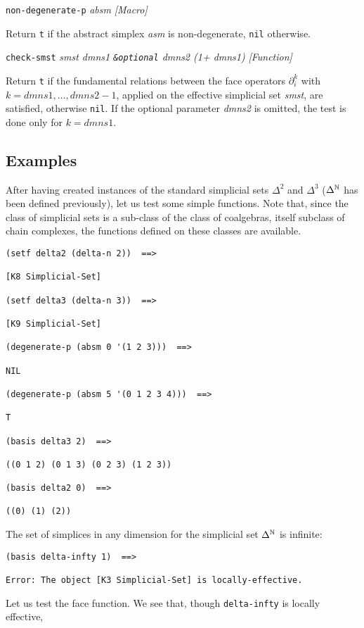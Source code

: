 {{\leftskip=5mm
{\tt non-degenerate-p} {\em  absm} \hfill {\em [Macro]} \par}
{\leftskip=15mm
Return {\tt t} if the abstract simplex {\em asm} is non-degenerate, {\tt nil} otherwise. \par}
{\leftskip=5mm
{\tt check-smst} {\em smst dmns1 {\tt \&optional} dmns2 (1+ dmns1)} \hfill {\em [Function]}  \par}
{\leftskip=15mm
Return {\tt t} if the fundamental relations between the face operators $\partial_i^k$
with $k=dmns1,\ldots, dmns2-1$,
applied on the effective simplicial set {\em smst}, are satisfied, otherwise {\tt nil}.
If the optional parameter {\em dmns2} is omitted, the test is done only for
$k=dmns1$. \par}
}

\subsection* {Examples}
After having created instances of the standard simplicial sets $\Delta^2$ and $\Delta^3$
($\Delta^{{\mathbb{N}}}$ has been defined previously), let us test some simple functions.
Note that, since the class of simplicial sets is a sub-class of the class of coalgebras,
itself subclass of chain complexes,
the functions defined on these classes are available.
{\footnotesize\begin{verbatim}
(setf delta2 (delta-n 2))  ==>

[K8 Simplicial-Set]

(setf delta3 (delta-n 3))  ==>

[K9 Simplicial-Set]

(degenerate-p (absm 0 '(1 2 3)))  ==>

NIL

(degenerate-p (absm 5 '(0 1 2 3 4)))  ==>

T

(basis delta3 2)  ==>

((0 1 2) (0 1 3) (0 2 3) (1 2 3))

(basis delta2 0)  ==>

((0) (1) (2))
\end{verbatim}}
The set of simplices in any dimension for the simplicial set $\Delta^{\mathbb{N}}$ is infinite:
{\footnotesize\begin{verbatim}
(basis delta-infty 1)  ==>

Error: The object [K3 Simplicial-Set] is locally-effective.
\end{verbatim}}
Let us test the face function. We see that, though {\tt delta-infty} is locally effective,
